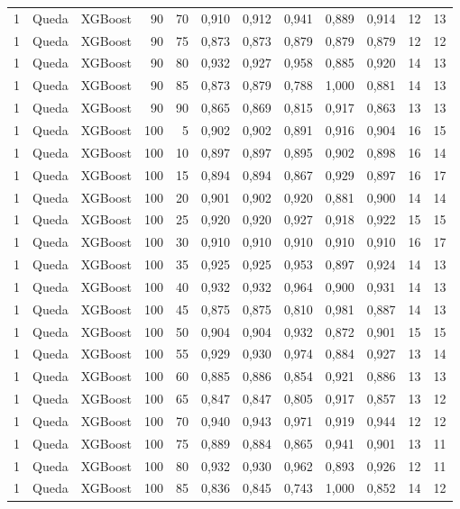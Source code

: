 \begin{longtable}{@{}rllrrrrrrrrr@{}}
1 & Queda & XGBoost & 90 & 70 & 0,910 & 0,912 & 0,941 & 0,889 & 0,914 & 12 & 13 \\
1 & Queda & XGBoost & 90 & 75 & 0,873 & 0,873 & 0,879 & 0,879 & 0,879 & 12 & 12 \\
1 & Queda & XGBoost & 90 & 80 & 0,932 & 0,927 & 0,958 & 0,885 & 0,920 & 14 & 13 \\
1 & Queda & XGBoost & 90 & 85 & 0,873 & 0,879 & 0,788 & 1,000 & 0,881 & 14 & 13 \\
1 & Queda & XGBoost & 90 & 90 & 0,865 & 0,869 & 0,815 & 0,917 & 0,863 & 13 & 13 \\
1 & Queda & XGBoost & 100 & 5 & 0,902 & 0,902 & 0,891 & 0,916 & 0,904 & 16 & 15 \\
1 & Queda & XGBoost & 100 & 10 & 0,897 & 0,897 & 0,895 & 0,902 & 0,898 & 16 & 14 \\
1 & Queda & XGBoost & 100 & 15 & 0,894 & 0,894 & 0,867 & 0,929 & 0,897 & 16 & 17 \\
1 & Queda & XGBoost & 100 & 20 & 0,901 & 0,902 & 0,920 & 0,881 & 0,900 & 14 & 14 \\
1 & Queda & XGBoost & 100 & 25 & 0,920 & 0,920 & 0,927 & 0,918 & 0,922 & 15 & 15 \\
1 & Queda & XGBoost & 100 & 30 & 0,910 & 0,910 & 0,910 & 0,910 & 0,910 & 16 & 17 \\
1 & Queda & XGBoost & 100 & 35 & 0,925 & 0,925 & 0,953 & 0,897 & 0,924 & 14 & 13 \\
1 & Queda & XGBoost & 100 & 40 & 0,932 & 0,932 & 0,964 & 0,900 & 0,931 & 14 & 13 \\
1 & Queda & XGBoost & 100 & 45 & 0,875 & 0,875 & 0,810 & 0,981 & 0,887 & 14 & 13 \\
1 & Queda & XGBoost & 100 & 50 & 0,904 & 0,904 & 0,932 & 0,872 & 0,901 & 15 & 15 \\
1 & Queda & XGBoost & 100 & 55 & 0,929 & 0,930 & 0,974 & 0,884 & 0,927 & 13 & 14 \\
1 & Queda & XGBoost & 100 & 60 & 0,885 & 0,886 & 0,854 & 0,921 & 0,886 & 13 & 13 \\
1 & Queda & XGBoost & 100 & 65 & 0,847 & 0,847 & 0,805 & 0,917 & 0,857 & 13 & 12 \\
1 & Queda & XGBoost & 100 & 70 & 0,940 & 0,943 & 0,971 & 0,919 & 0,944 & 12 & 12 \\
1 & Queda & XGBoost & 100 & 75 & 0,889 & 0,884 & 0,865 & 0,941 & 0,901 & 13 & 11 \\
1 & Queda & XGBoost & 100 & 80 & 0,932 & 0,930 & 0,962 & 0,893 & 0,926 & 12 & 11 \\
1 & Queda & XGBoost & 100 & 85 & 0,836 & 0,845 & 0,743 & 1,000 & 0,852 & 14 & 12 \\

\end{longtable}
